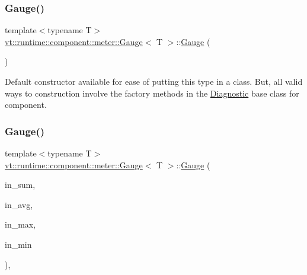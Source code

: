 \subsubsection{\texorpdfstring{Gauge()}{Gauge()}\hspace{0.1cm}{\footnotesize\ttfamily [1/2]}}
{\footnotesize\ttfamily template$<$typename T$>$ \\
\hyperlink{structvt_1_1runtime_1_1component_1_1meter_1_1_gauge}{vt\+::runtime\+::component\+::meter\+::\+Gauge}$<$ T $>$\+::\hyperlink{structvt_1_1runtime_1_1component_1_1meter_1_1_gauge}{Gauge} (\begin{DoxyParamCaption}{ }\end{DoxyParamCaption})\hspace{0.3cm}{\ttfamily [default]}}



Default constructor available for ease of putting this type in a class. But, all valid ways to construction involve the factory methods in the {\ttfamily \hyperlink{structvt_1_1runtime_1_1component_1_1_diagnostic}{Diagnostic}} base class for component. 

\mbox{\label{structvt_1_1runtime_1_1component_1_1meter_1_1_gauge_ad698621de4f0e95e66190c016684aafe}} 
\subsubsection{\texorpdfstring{Gauge()}{Gauge()}\hspace{0.1cm}{\footnotesize\ttfamily [2/2]}}
{\footnotesize\ttfamily template$<$typename T$>$ \\
\hyperlink{structvt_1_1runtime_1_1component_1_1meter_1_1_gauge}{vt\+::runtime\+::component\+::meter\+::\+Gauge}$<$ T $>$\+::\hyperlink{structvt_1_1runtime_1_1component_1_1meter_1_1_gauge}{Gauge} (\begin{DoxyParamCaption}\item[{\hyperlink{structvt_1_1runtime_1_1component_1_1detail_1_1_diagnostic_value}{detail\+::\+Diagnostic\+Value}$<$ T $>$ $\ast$}]{in\+\_\+sum,  }\item[{\hyperlink{structvt_1_1runtime_1_1component_1_1detail_1_1_diagnostic_value}{detail\+::\+Diagnostic\+Value}$<$ T $>$ $\ast$}]{in\+\_\+avg,  }\item[{\hyperlink{structvt_1_1runtime_1_1component_1_1detail_1_1_diagnostic_value}{detail\+::\+Diagnostic\+Value}$<$ T $>$ $\ast$}]{in\+\_\+max,  }\item[{\hyperlink{structvt_1_1runtime_1_1component_1_1detail_1_1_diagnostic_value}{detail\+::\+Diagnostic\+Value}$<$ T $>$ $\ast$}]{in\+\_\+min }\end{DoxyParamCaption})\hspace{0.3cm}{\ttfamily [inline]}, {\ttfamily [private]}}



